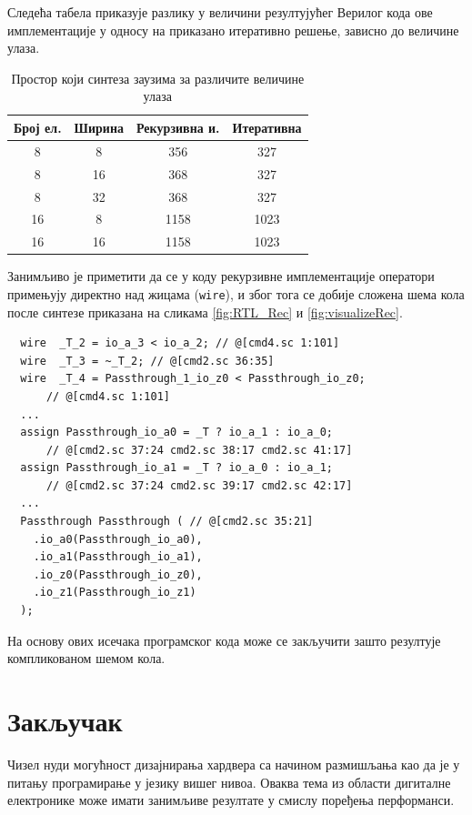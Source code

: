 \documentclass[12pt, a4paper]{article}
\theoremstyle{definition}
\begin{document}
Следећа табела приказује разлику у величини резултујућег Верилог кода ове имплементације у односу на приказано итеративно решење, зависно до величине улаза.

\begin{table}[H]
\centering
 \begin{tabular}{| c | c | c c |}
  \hline
  Број ел. & Ширина & Рекурзивна и. & Итеративна \\
  \hline
  8 & 8  & 356 & 327 \\
  8 & 16 & 368 & 327 \\
  8 & 32 & 368 & 327 \\
  \hline
  16 & 8 & 1158 & 1023 \\
  16 & 16 & 1158 & 1023 \\
  \hline
 \end{tabular}
 \caption{Простор који синтеза заузима за различите величине улаза}
 \label{tab:brojLinija}
\end{table}

Занимљиво је приметити да се у коду рекурзивне имплементације оператори примењују директно над жицама (\verb+wire+), и због тога се добије сложена шема кола после синтезе приказана на сликама \ref{fig:RTL_Rec} и \ref{fig:visualizeRec}.

\begin{verbatim}
  wire  _T_2 = io_a_3 < io_a_2; // @[cmd4.sc 1:101]
  wire  _T_3 = ~_T_2; // @[cmd2.sc 36:35]
  wire  _T_4 = Passthrough_1_io_z0 < Passthrough_io_z0;
      // @[cmd4.sc 1:101]
  ...
  assign Passthrough_io_a0 = _T ? io_a_1 : io_a_0;
      // @[cmd2.sc 37:24 cmd2.sc 38:17 cmd2.sc 41:17]
  assign Passthrough_io_a1 = _T ? io_a_0 : io_a_1;
      // @[cmd2.sc 37:24 cmd2.sc 39:17 cmd2.sc 42:17]
  ...
  Passthrough Passthrough ( // @[cmd2.sc 35:21]
    .io_a0(Passthrough_io_a0),
    .io_a1(Passthrough_io_a1),
    .io_z0(Passthrough_io_z0),
    .io_z1(Passthrough_io_z1)
  );
\end{verbatim}

На основу ових исечака програмског кода може се закључити зашто резултује компликованом шемом кола.

\newpage
\section{Закључак}

Чизел нуди могућност дизајнирања хардвера са начином размишљања као да је у питању програмирање у језику вишег нивоа. Оваква тема из области дигиталне електронике може имати занимљиве резултате у смислу поређења перформанси.
\end{document}
